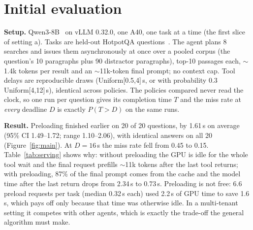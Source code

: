 \documentclass{article}
\begin{document}
\section{Initial evaluation}
\label{sec:eval}
\textbf{Setup.} Qwen3-8B~\cite{qwen3} on vLLM 0.32.0, one A40, one task at a time (the first slice of
setting a). Tasks are held-out HotpotQA questions~\cite{yang2018hotpotqa}. The agent plans 8 searches and
issues them asynchronously at once over a pooled corpus (the question's 10 paragraphs plus 90 distractor
paragraphs), top-10 passages each, ${\sim}$1.4k tokens per result and an ${\sim}$11k-token final prompt; no
context cap. Tool delays are reproducible draws (Uniform[0.5,4]\,s, or with probability 0.3 Uniform[4,12]\,s),
identical across policies. The policies compared never read the clock, so one run per question gives its
completion time $T$ and the miss rate at \emph{every} deadline $D$ is exactly $P(T>D)$ on the same runs.

\textbf{Result.} Preloading finished earlier on 20 of 20 questions, by 1.61\,s on average (95\% CI
1.49--1.72; range 1.10--2.06), with identical answers on all 20 (Figure~\ref{fig:main}). At $D=16$\,s the miss
rate fell from 0.45 to 0.15. Table~\ref{tab:serving} shows why: without preloading the GPU is idle for the whole
tool wait and the final request prefills ${\sim}$11k tokens after the last tool returns; with preloading,
87\% of the final prompt comes from the cache and the model time after the last return drops from 2.34\,s to
0.73\,s. Preloading is not free: 6.6 preload requests per task (median 0.32\,s each) used 2.2\,s of GPU time to
save 1.6\,s, which pays off only because that time was otherwise idle. In a multi-tenant setting it competes
with other agents, which is exactly the trade-off the general algorithm must make.

\begin{table}[t]
\centering
\caption{Serving view (means over the 20 questions). GPU util.\ = fraction of the tool-wait window in which the
model is busy; cached = share of the final request's prompt served from the prefix cache.}
\label{tab:serving}
\vspace{-3mm}
\end{table}
\end{document}

